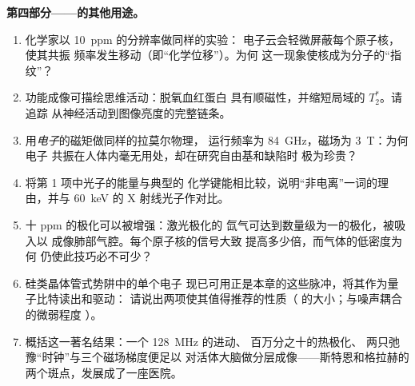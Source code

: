 \begin{problem}
\medskip\noindent\textbf{第四部分——的其他用途。}
\begin{enumerate}[resume]
  \item 化学家以 \qty{10}{ppm} 的分辨率做同样的实验：
        电子云会轻微屏蔽每个原子核，使其共振
        频率发生移动（即“化学位移”）。为何
        这一现象使核成为分子的“指纹”？
  \item 功能成像可描绘思维活动：脱氧血红蛋白
        具有顺磁性，并缩短局域的 $T_2^*$。请追踪
        从神经活动到图像亮度的完整链条。
  \item 用\emph{电子}的磁矩做同样的拉莫尔物理，
        运行频率为 \qty{84}{GHz}，磁场为 \qty{3}{T}：为何电子
        共振在人体内毫无用处，却在研究自由基和缺陷时
        极为珍贵？
  \item 将第 1 项中光子的能量与典型的
        化学键能相比较，说明“非电离”一词的理由，并与
        \qty{60}{keV} 的 X 射线光子作对比。
  \item 十 ppm 的极化可以被增强：激光极化的
        氙气可达到数量级为一的极化，被吸入以
        成像肺部气腔。每个原子核的信号大致
        提高多少倍，而气体的低密度为何
        仍使此技巧必不可少？
  \item 硅类晶体管式势阱中的单个电子
        现已可用正是本章的这些脉冲，将其作为量子比特读出和驱动：
        请说出两项使其值得推荐的性质（
        的大小；与噪声耦合的微弱程度
        ）。
  \item 概括这一著名结果：一个 \qty{128}{MHz} 的进动、
        百万分之十的热极化、
        两只弛豫“时钟”与三个磁场梯度便足以
        对活体大脑做分层成像——斯特恩和格拉赫的
        两个斑点，发展成了一座医院。
\end{enumerate}
\end{problem}
